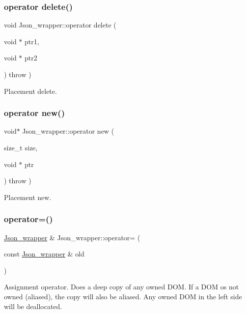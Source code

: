 \subsubsection{\texorpdfstring{operator delete()}{operator delete()}}
{\footnotesize\ttfamily void Json\+\_\+wrapper\+::operator delete (\begin{DoxyParamCaption}\item[{void $\ast$}]{ptr1,  }\item[{void $\ast$}]{ptr2 }\end{DoxyParamCaption}) throw  ) \hspace{0.3cm}{\ttfamily [inline]}}

Placement delete. \mbox{\label{classJson__wrapper_a6e434e2fbe3959b7e1beab87b96acf29}} 
\subsubsection{\texorpdfstring{operator new()}{operator new()}}
{\footnotesize\ttfamily void$\ast$ Json\+\_\+wrapper\+::operator new (\begin{DoxyParamCaption}\item[{size\+\_\+t}]{size,  }\item[{void $\ast$}]{ptr }\end{DoxyParamCaption}) throw  ) \hspace{0.3cm}{\ttfamily [inline]}}

Placement new. \mbox{\label{classJson__wrapper_abbff97b308424dd315c9f11958e64c62}} 
\subsubsection{\texorpdfstring{operator=()}{operator=()}}
{\footnotesize\ttfamily \mbox{\hyperlink{classJson__wrapper}{Json\+\_\+wrapper}} \& Json\+\_\+wrapper\+::operator= (\begin{DoxyParamCaption}\item[{const \mbox{\hyperlink{classJson__wrapper}{Json\+\_\+wrapper}} \&}]{old }\end{DoxyParamCaption})}

Assignment operator. Does a deep copy of any owned D\+OM. If a D\+OM os not owned (aliased), the copy will also be aliased. Any owned D\+OM in the left side will be deallocated. \mbox{\label{classJson__wrapper_a5d65ee3ef4ba89a3be9da615b056ea14}} 
